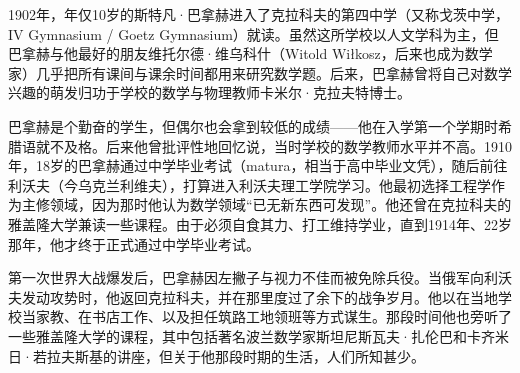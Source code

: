 1902年，年仅10岁的斯特凡·巴拿赫进入了克拉科夫的第四中学（又称戈茨中学，IV Gymnasium / Goetz Gymnasium）就读。虽然这所学校以人文学科为主，但巴拿赫与他最好的朋友维托尔德·维乌科什（Witold Wiłkosz，后来也成为数学家）几乎把所有课间与课余时间都用来研究数学题。后来，巴拿赫曾将自己对数学兴趣的萌发归功于学校的数学与物理教师卡米尔·克拉夫特博士。

巴拿赫是个勤奋的学生，但偶尔也会拿到较低的成绩——他在入学第一个学期时希腊语就不及格。后来他曾批评性地回忆说，当时学校的数学教师水平并不高。1910年，18岁的巴拿赫通过中学毕业考试（matura，相当于高中毕业文凭），随后前往利沃夫（今乌克兰利维夫），打算进入利沃夫理工学院学习。他最初选择工程学作为主修领域，因为那时他认为数学领域“已无新东西可发现”。他还曾在克拉科夫的雅盖隆大学兼读一些课程。由于必须自食其力、打工维持学业，直到1914年、22岁那年，他才终于正式通过中学毕业考试。

第一次世界大战爆发后，巴拿赫因左撇子与视力不佳而被免除兵役。当俄军向利沃夫发动攻势时，他返回克拉科夫，并在那里度过了余下的战争岁月。他以在当地学校当家教、在书店工作、以及担任筑路工地领班等方式谋生。那段时间他也旁听了一些雅盖隆大学的课程，其中包括著名波兰数学家斯坦尼斯瓦夫·扎伦巴和卡齐米日·若拉夫斯基的讲座，但关于他那段时期的生活，人们所知甚少。
\subsubsection{}